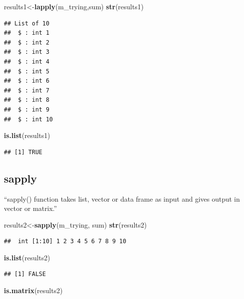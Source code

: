 \documentclass[]{book}
\newenvironment{Shaded}{\begin{snugshade}}{\end{snugshade}}
\newcommand{\KeywordTok}[1]{\textcolor[rgb]{0.13,0.29,0.53}{\textbf{#1}}}
\newcommand{\NormalTok}[1]{#1}
\begin{document}
\begin{Shaded}
\begin{Highlighting}[]
\NormalTok{results1<-}\KeywordTok{lapply}\NormalTok{(m_trying,sum)}
\KeywordTok{str}\NormalTok{(results1)}
\end{Highlighting}
\end{Shaded}

\begin{verbatim}
## List of 10
##  $ : int 1
##  $ : int 2
##  $ : int 3
##  $ : int 4
##  $ : int 5
##  $ : int 6
##  $ : int 7
##  $ : int 8
##  $ : int 9
##  $ : int 10
\end{verbatim}

\begin{Shaded}
\begin{Highlighting}[]
\KeywordTok{is.list}\NormalTok{(results1)}
\end{Highlighting}
\end{Shaded}

\begin{verbatim}
## [1] TRUE
\end{verbatim}

\subsection{sapply}\label{sapply}

``sapply() function takes list, vector or data frame as input and gives
output in vector or matrix.''

\begin{Shaded}
\begin{Highlighting}[]
\NormalTok{results2<-}\KeywordTok{sapply}\NormalTok{(m_trying, sum)}
\KeywordTok{str}\NormalTok{(results2)}
\end{Highlighting}
\end{Shaded}

\begin{verbatim}
##  int [1:10] 1 2 3 4 5 6 7 8 9 10
\end{verbatim}

\begin{Shaded}
\begin{Highlighting}[]
\KeywordTok{is.list}\NormalTok{(results2)}
\end{Highlighting}
\end{Shaded}

\begin{verbatim}
## [1] FALSE
\end{verbatim}

\begin{Shaded}
\begin{Highlighting}[]
\KeywordTok{is.matrix}\NormalTok{(results2)}
\end{Highlighting}
\end{Shaded}
\end{document}

